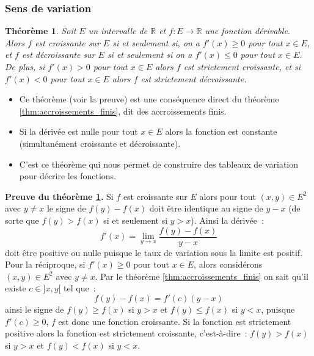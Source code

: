 \documentclass[10pt,notheorems]{beamer}
\theoremstyle{plain}
\newtheorem{theorem}{Théorème}
\theoremstyle{definition} %
\begin{document}
\begin{frame}
  \frametitle{Sens de variation}
  \hypertarget{slide_sens_de_variation_1}{}

  \begin{theorem}\label{thm:sens_de_variation}
    Soit $E$ un intervalle de $\mathbb R$ et $f: E\rightarrow \mathbb R$ une fonction dérivable. Alors $f$ est croissante sur $E$ si et seulement si, on a $f'(x)\geq0$ pour tout $x\in E$, et $f$ est décroissante sur $E$ si et seulement si on a $f'(x)\leq 0$ pour tout $x\in E$. De plus, si $f'(x)>0$ pour tout $x\in E$  alors $f$  est strictement croissante, et si $f'(x)<0$ pour tout $x\in E$ alors $f$ est strictement décroissante.
  \end{theorem}

  \bigskip

  \begin{itemize}

  \item Ce théorème (voir la preuve) est une conséquence direct du théorème \hyperlink{slide_accroissements_finis_1}{\ref{thm:accroissements_finis}}, dit des accroissements finis.\newline

  \item Si la dérivée est nulle pour tout $x\in E$ alors la fonction est constante (simultanément croissante et décroissante).\newline

  \item C'est ce théorème qui nous permet de construire des tableaux de variation pour décrire les fonctions.

  \end{itemize}

\end{frame}


\begin{notes}

  \textbf{Preuve du théorème \hyperlink{slide_sens_de_variation_1}{\ref{thm:sens_de_variation}}.} Si $f$ est croissante sur $E$ alors pour tout $(x,y)\in E^2$ avec $y\neq x$ le signe de $f(y)-f(x)$ doit être identique au signe de $y-x$ (de sorte que $f(y)>f(x)$ si et seulement si $y>x$). Ainsi la dérivée~:
  \[
    f'(x) = \lim_{y\rightarrow x}\frac{f(y)-f(x)}{y-x}
  \]
  doit être positive ou nulle puisque le taux de variation sous la limite est positif. Pour la réciproque, si $f'(x)\geq 0$ pour tout $x\in E$, alors considérons $(x,y)\in E^2$ avec $y\neq x$. Par le théorème \hyperlink{slide_accroissements_finis_1}{\ref{thm:accroissements_finis}} on sait qu'il existe $c\in]x,y[$ tel que~:
  \[
    f(y)-f(x) = f'(c)(y-x)
  \]
  ainsi le signe de $f(y)\geq f(x)$ si $y>x$ et $f(y)\leq f(x)$ si $y<x$, puisque $f'(c)\geq 0$, $f$ est donc une fonction croissante. Si la fonction est strictement positive alors la fonction est strictement croissante, c'est-à-dire~: $f(y)>f(x)$ si $y>x$ et $f(y)<f(x)$ si $y<x$.

\end{notes}
\end{document}
